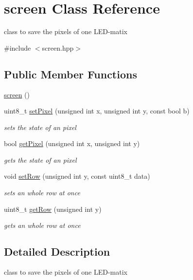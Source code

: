 \hypertarget{classscreen}{}\section{screen Class Reference}
\label{classscreen}


class to save the pixels of one L\+E\+D-\/matix  




{\ttfamily \#include $<$screen.\+hpp$>$}

\subsection*{Public Member Functions}
\begin{DoxyCompactItemize}
\item 
\mbox{\hyperlink{classscreen_a926d04fbd3d3e5b721b7751512a6c027}{screen}} ()
\item 
uint8\+\_\+t \mbox{\hyperlink{classscreen_a1d757204ed919e555c19f56a2131b331}{set\+Pixel}} (unsigned int x, unsigned int y, const bool b)
\begin{DoxyCompactList}\small\item\em sets the state of an pixel \end{DoxyCompactList}\item 
bool \mbox{\hyperlink{classscreen_a00b5d23df677adb98f741a0aa09ef499}{get\+Pixel}} (unsigned int x, unsigned int y)
\begin{DoxyCompactList}\small\item\em gets the state of an pixel \end{DoxyCompactList}\item 
void \mbox{\hyperlink{classscreen_ac973f2eb984172ce328637fd7821ecb8}{set\+Row}} (unsigned int y, const uint8\+\_\+t data)
\begin{DoxyCompactList}\small\item\em sets an whole row at once \end{DoxyCompactList}\item 
uint8\+\_\+t \mbox{\hyperlink{classscreen_a06ba2227cb388ba2365e2042cd2022c0}{get\+Row}} (unsigned int y)
\begin{DoxyCompactList}\small\item\em gets an whole row at once \end{DoxyCompactList}\end{DoxyCompactItemize}


\subsection{Detailed Description}
class to save the pixels of one L\+E\+D-\/matix 

